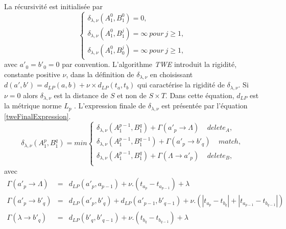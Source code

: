 La r\'ecursivit\'e est initialis\'ee par 
  \[  
 	\begin{cases}
 	\delta_{\lambda,\nu}(A_1^0, B_1^0) = 0, \\
 	\delta_{\lambda,\nu}(A_1^0, B_1^j) = \infty ~pour~ j \ge 1, \\
 	\delta_{\lambda,\nu}(A_1^0, B_0^j) = \infty ~pour~ j \ge 1,
 	\end{cases}
 \]
 avec $a'_0 = b'_0 = 0$ par convention.
 \newline
L'algorithme {\em TWE} introduit la rigidit\'e,  constante positive $\nu$, dans la d\'efinition de $\delta_{\lambda, \nu}$ en choisissant $d(a', b') = d_{LP}(a,b) + \nu \times d_{LP}(t_a,t_b)$ qui caract\'erise la rigidit\'e de $\delta_{\lambda, \nu}$.
Si $\nu = 0$ alors $\delta_{\lambda, \nu}$ est la distance de $S$ et non de $S \times T$.
Dans cette \'equation, $d_{LP}$ est la m\'etrique  norme $L_p$ \cite{chen2004marriageLpNorm}.
L'expression finale de $\delta_{\lambda, \nu}$ est pr\'esent\'ee par l'\'equation \ref{tweFinalExpression}.
\begin{equation}
	\delta_{\lambda,\nu}(A_1^p, B_1^q) = min
	\begin{cases}
		\delta_{\lambda,\nu}(A_1^{p-1}, B_1^q) + \Gamma(a'_p \rightarrow \Lambda) ~~~~~ delete_A, \\
		 \delta_{\lambda,\nu}(A_1^{p-1}, B_1^{q-1}) + \Gamma(a'_p \rightarrow b'_q) ~~~~~ match, \\
		 \delta_{\lambda,\nu}(A_1^{p-1}, B_1^q) + \Gamma(\Lambda \rightarrow a'_p) ~~~~~ delete_B, \\
	\end{cases}
	\label{tweFinalExpression}
\end{equation} 
avec 
 \[
	\begin{array}{lcl} 
	\Gamma(a'_p \rightarrow \Lambda) &=& d_{LP}(a'_p, a_{p-1}) +\nu . (t_{a_p} - t_{a_{p-1}}) +\lambda \\  
	\Gamma(a'_p \rightarrow b'_q) &=& d_{LP}(a'_p, b'_{q}) + d_{LP}(a'_{p-1}, b'_{q-1}) + \nu . ( |t_{a_p} - t_{b_{q}}| +  |t_{a_{p-1}} - t_{b_{q-1}}|)  \\ 
	\Gamma( \lambda \rightarrow b'_q) &=& d_{LP}(b'_q, b'_{q-1}) + \nu . (t_{b_q} - t_{b_{q-1}}) + \lambda
	\end{array}
\]	
\vspace{-2.25 em}